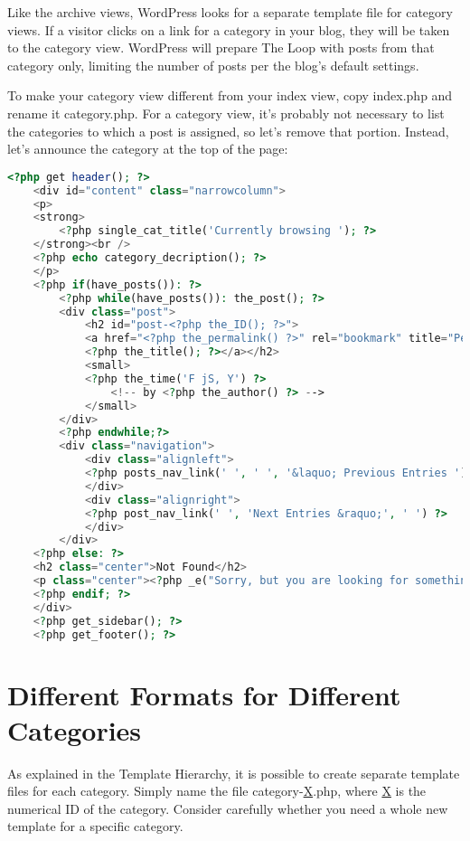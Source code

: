 Like the archive views, WordPress looks for a separate template file for category views. If a visitor clicks on a link for a category in your blog, they will be taken to the category view. WordPress will prepare The Loop with posts from that category only, limiting the number of posts per the blog's default settings.

To make your category view different from your index view, copy index.php and rename it category.php. For a category view, it's probably not necessary to list the categories to which a post is assigned, so let's remove that portion. Instead, let's announce the category at the top of the page:

\begin{lstlisting}[language=PHP]
	<?php get header(); ?>
	<div id="content" class="narrowcolumn">
	<p>
	<strong>
		<?php single_cat_title('Currently browsing '); ?>
	</strong><br />
	<?php echo category_decription(); ?>
	</p>
	<?php if(have_posts()): ?>
		<?php while(have_posts()): the_post(); ?>
		<div class="post">
			<h2 id="post-<?php the_ID(); ?>">
			<a href="<?php the_permalink() ?>" rel="bookmark" title="Permanent link to <?php the_title(); ?>">
			<?php the_title(); ?></a></h2>
			<small>
			<?php the_time('F jS, Y') ?>
				<!-- by <?php the_author() ?> -->
			</small>
		</div>
		<?php endwhile;?>
		<div class="navigation">
			<div class="alignleft">
			<?php posts_nav_link(' ', ' ', '&laquo; Previous Entries ') ?>
			</div>
			<div class="alignright">
			<?php post_nav_link(' ', 'Next Entries &raquo;', ' ') ?>
			</div>
		</div>
	<?php else: ?>
	<h2 class="center">Not Found</h2>
	<p class="center"><?php _e("Sorry, but you are looking for something that isn't here."); ?></p>
	<?php endif; ?>
	</div>
	<?php get_sidebar(); ?>
	<?php get_footer(); ?>
\end{lstlisting}

\section{Different Formats for Different Categories}

As explained in the Template Hierarchy, it is possible to create separate template files for each category. Simply name the file category-\underline{X}.php, where \underline{X} is the numerical ID of the category. Consider carefully whether you need a whole new template for a specific category.

